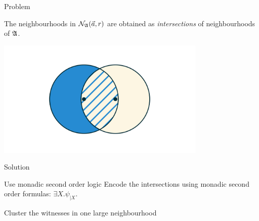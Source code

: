 \documentclass{beamer}
\begin{document}
\begin{frame}{Problem}
    \begin{center}
        The neighbourhoods in 
        $\mathcal{N}_{\mathfrak{A}}(\vec{a}, r)$
        are obtained as \emph{intersections}
        of neighbourhoods of $\mathfrak{A}$.
    \end{center}

    \begin{center}
        \includegraphics[width=10cm]{figures/quizz_Page 18.png}
    \end{center}
\end{frame}

\begin{frame}{Solution}
    \begin{alertblock}{Use monadic second order logic}
        \vspace{0.1em}
        Encode the intersections using monadic second order formulas:
        \(\exists X. \psi_{|X}\).
    \end{alertblock}

    \begin{alertblock}{Cluster the witnesses in one large neighbourhood}
    \end{alertblock}
\end{frame}
\end{document}
